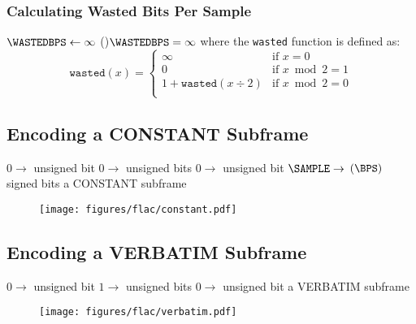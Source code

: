 \subsubsection{Calculating Wasted Bits Per Sample}
\label{flac:calculate_wasted_bps}
{
  $\text{\WASTEDBPS} \leftarrow \infty$
  \eIf(){$\WASTEDBPS = \infty$}{
    \;
  }{
    \Return \WASTEDBPS\;
  }
  \EALGORITHM
  where the \texttt{wasted} function is defined as:
  \begin{equation*}
    \texttt{wasted}(x) =
    \begin{cases}
      \infty & \text{if } x = 0 \\
      0 & \text{if } x \bmod 2 = 1 \\
      1 + \texttt{wasted}(x \div 2) & \text{if } x \bmod 2 = 0 \\
    \end{cases}
  \end{equation*}
}

\clearpage

\subsection{Encoding a CONSTANT Subframe}
\label{flac:encode_constant_subframe}
{
$0 \rightarrow$  unsigned bit
$0 \rightarrow$  unsigned bits
$0 \rightarrow$  unsigned bit
$\text{\SAMPLE} \rightarrow$ \WRITE $(\BPS)$ signed bits\;
\Return a CONSTANT subframe\;
\EALGORITHM
}
\begin{figure}[h]
  \texttt{[image: figures/flac/constant.pdf]}
\end{figure}

\subsection{Encoding a VERBATIM Subframe}
\label{flac:encode_verbatim_subframe}
{
$0 \rightarrow$  unsigned bit
$1 \rightarrow$  unsigned bits
$0 \rightarrow$  unsigned bit
\Return a VERBATIM subframe\;
\EALGORITHM
}
\begin{figure}[h]
  \texttt{[image: figures/flac/verbatim.pdf]}
\end{figure}

